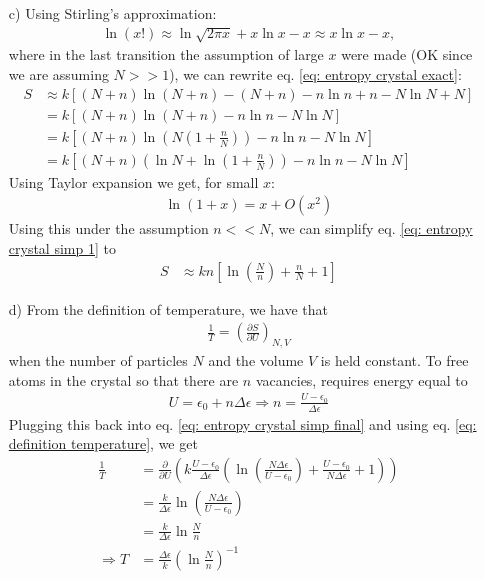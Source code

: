 \documentclass[11pt]{article}
\newcounter{excount}
\newenvironment{exercise}[1][]{\addtocounter{excount}{1} \noindent {\bf Exercise
    \arabic{excount} #1}\hspace{2mm}}{\vspace{4mm}}
\begin{document}
\begin{exercise}
\begin{itemize}
		\item[c)]
			Using Stirling's approximation:
			\begin{align}
				\ln (x!) \approx \ln \sqrt{2\pi x} + x\ln x - x \approx x\ln x - x, \label{eq: strilings approximation}
			\end{align}
			where in the last transition the assumption of large $x$ were made (OK since we are assuming $N>>1$), we can rewrite eq. \eqref{eq: entropy crystal exact}:
			\begin{align}
				S	&\approx k\left[(N+n)\ln (N+n) - (N+n) - n\ln n + n - N\ln N + N \right] \nonumber \\
					&= k\left[(N+n)\ln(N+n) - n\ln n - N \ln N \right] \nonumber \\
					&= k\left[(N+n) \ln \left( N \left( 1+\frac{n}{N} \right) \right) -n \ln n - N \ln N \right] \nonumber \\
					&= k \left[ (N+n) \left( \ln N + \ln \left( 1+\frac{n}{N} \right) \right) - n\ln n - N\ln N \right] \label{eq: entropy crystal simp 1}
			\end{align}
			Using Taylor expansion we get, for small $x$:
			\begin{align*}
				\ln (1+x) = x + O(x^2)
			\end{align*}
			Using this under the assumption $n << N$, we can simplify eq. \eqref{eq: entropy crystal simp 1} to
			\begin{align}
				S 	&\approx kn\left[\ln \left( \frac{N}{n} \right) +\frac{n}{N} + 1  \right] \label{eq: entropy crystal simp final}
			\end{align}
		
		
		
		
		
		\item[d)]
			From the definition of temperature, we have that
			\begin{align}
				\frac{1}{T} = \left( \frac{\partial S}{\partial U} \right) _{N,V} \label{eq: definition temperature}
			\end{align}
			when the number of particles $N$ and the volume $V$ is held constant. To free atoms in the crystal so that there are $n$ vacancies, requires energy equal to
			\begin{align*}
				U = \epsilon_0 + n\Delta \epsilon \Rightarrow n = \frac{U - \epsilon_0}{\Delta \epsilon}
			\end{align*}
			Plugging this back into eq. \eqref{eq: entropy crystal simp final} and using eq. \eqref{eq: definition temperature}, we get
			\begin{align*}
				\frac{1}{T} 	&= \frac{\partial}{\partial U} \left( k \frac{U-\epsilon_0}{\Delta \epsilon} \left( \ln \left( \frac{N \Delta \epsilon}{U-\epsilon_0} \right) + \frac{U-\epsilon_0}{N\Delta \epsilon} + 1 \right)  \right) \\
									&= \frac{k}{\Delta \epsilon} \ln \left( \frac{N\Delta \epsilon}{U-\epsilon_0} \right)  \\
									&= \frac{k}{\Delta \epsilon} \ln \frac{N}{n} \\
			\Rightarrow T	&= \frac{\Delta \epsilon}{k} \left(\ln \frac{N}{n}\right) ^{-1}
			\end{align*}
			

\end{itemize}
\end{exercise}
\end{document}
